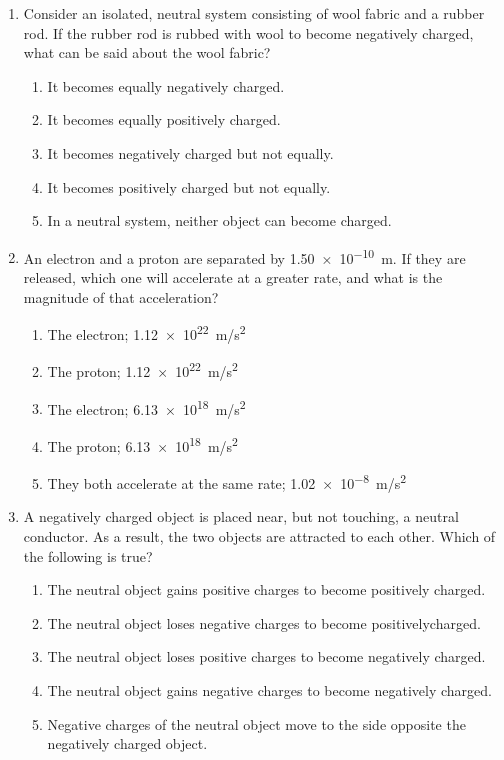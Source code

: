 \documentclass{../../../oss-apphys}
\begin{document}
\begin{multicols*}{2}
\begin{enumerate}[leftmargin=18pt]
  \item Consider an isolated, neutral system consisting of wool fabric and a
    rubber rod. If the rubber rod is rubbed with wool to become negatively
    charged, what can be said about the wool fabric?
    \begin{enumerate}[nosep,leftmargin=18pt,label=(\Alph*)]
    \item It becomes equally negatively charged.
    \item It becomes equally positively charged.
    \item It becomes negatively charged but not equally.
    \item It becomes positively charged but not equally.
    \item In a neutral system, neither object can become charged.
    \end{enumerate}
    \vspace{.7in}
    
  \item An electron and a proton are separated by \SI{1.50e-10}{m}. If they are
    released, which one will accelerate at a greater rate, and what is the
    magnitude of that acceleration?
    \begin{enumerate}[nosep,leftmargin=18pt,label=(\Alph*)]
    \item The electron; \SI{1.12e22}{m/s^2}
    \item The proton; \SI{1.12e22}{m/s^2}
    \item The electron; \SI{6.13e18}{m/s^2}
    \item The proton; \SI{6.13e18}{m/s^2}
    \item They both accelerate at the same rate; \SI{1.02e-8}{m/s^2}
    \end{enumerate}
    \vspace{.7in}
    
  \item A negatively charged object is placed near, but not touching, a neutral
    conductor. As a result, the two objects are attracted to each other. Which
    of the following is true?
    \begin{enumerate}[nosep,leftmargin=18pt,label=(\Alph*)]
    \item The neutral object gains positive charges to become positively
      charged.
    \item The neutral object loses negative charges to become positivelycharged.
    \item The neutral object loses positive charges to become negatively
      charged.
    \item The neutral object gains negative charges to become negatively
      charged.
    \item Negative charges of the neutral object move to the side opposite
      the negatively charged object.
    \end{enumerate}
    \vspace{.7in}
    

\end{enumerate}
\end{multicols*}
\end{document}
